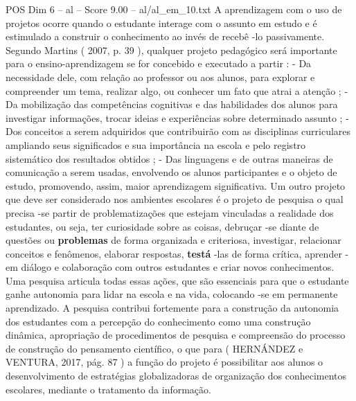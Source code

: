 \begin{textsample}{POS Dim 6 – al – Score 9.00 – al/al\_em\_10.txt}
A aprendizagem com o uso de projetos ocorre quando o estudante interage com o assunto em estudo e é estimulado a construir o conhecimento ao invés de recebê -lo passivamente.
Segundo Martins ( 2007, p. 39 ), qualquer projeto pedagógico será importante para o ensino-aprendizagem se for concebido e executado a partir : - Da necessidade dele, com relação ao professor ou aos alunos, para explorar e compreender um tema, realizar algo, ou conhecer um fato que atrai a atenção ; - Da mobilização das competências cognitivas e das habilidades dos alunos para investigar informações, trocar ideias e experiências sobre determinado assunto ; - Dos conceitos a serem adquiridos que contribuirão com as disciplinas curriculares ampliando seus significados e sua importância na escola e pelo registro sistemático dos resultados obtidos ; - Das linguagens e de outras maneiras de comunicação a serem usadas, envolvendo os alunos participantes e o objeto de estudo, promovendo, assim, maior aprendizagem significativa.
Um outro projeto que deve ser considerado nos ambientes escolares é o projeto de pesquisa o qual precisa -se partir de problematizações que estejam vinculadas a realidade dos estudantes, ou seja, ter curiosidade sobre as coisas, debruçar -se diante de questões ou \textbf{problemas} de forma organizada e criteriosa, investigar, relacionar conceitos e fenômenos, elaborar respostas, \textbf{testá} -las de forma crítica, aprender - em diálogo e colaboração com outros estudantes e criar novos conhecimentos.
Uma pesquisa articula todas essas ações, que são essenciais para que o estudante ganhe autonomia para lidar na escola e na vida, colocando -se em permanente aprendizado.
A pesquisa contribui fortemente para a construção da autonomia dos estudantes com a percepção do conhecimento como uma construção dinâmica, apropriação de procedimentos de pesquisa e compreensão do processo de construção do pensamento científico, o que para ( HERNÁNDEZ e VENTURA, 2017, pág. 87 ) a função do projeto é possibilitar aos alunos o desenvolvimento de estratégias globalizadoras de organização dos conhecimentos escolares, mediante o tratamento da informação.

\end{textsample}
